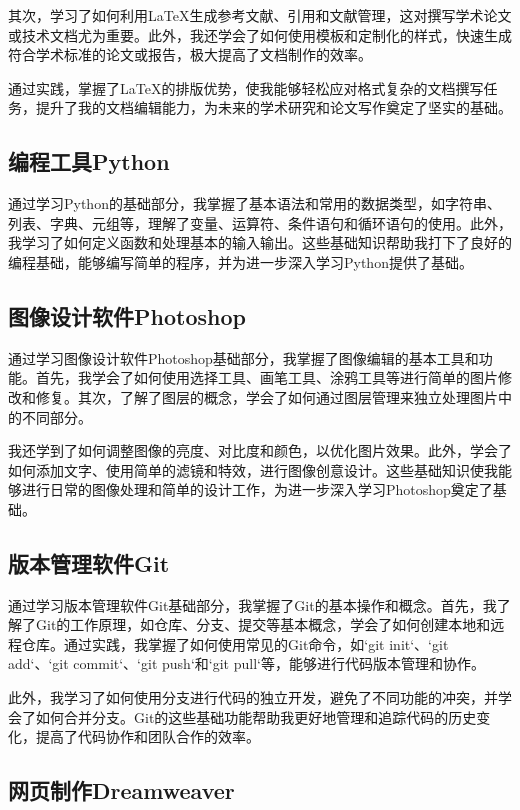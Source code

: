 \documentclass[supercite]{Experimental_Report}
\theoremstyle{definition}
\begin{document}
其次，学习了如何利用LaTeX生成参考文献、引用和文献管理，这对撰写学术论文或技术文档尤为重要。此外，我还学会了如何使用模板和定制化的样式，快速生成符合学术标准的论文或报告，极大提高了文档制作的效率。

通过实践，掌握了LaTeX的排版优势，使我能够轻松应对格式复杂的文档撰写任务，提升了我的文档编辑能力，为未来的学术研究和论文写作奠定了坚实的基础。

\subsection{编程工具Python}

通过学习Python的基础部分，我掌握了基本语法和常用的数据类型，如字符串、列表、字典、元组等，理解了变量、运算符、条件语句和循环语句的使用。此外，我学习了如何定义函数和处理基本的输入输出。这些基础知识帮助我打下了良好的编程基础，能够编写简单的程序，并为进一步深入学习Python提供了基础。

\subsection{图像设计软件Photoshop}

通过学习图像设计软件Photoshop基础部分，我掌握了图像编辑的基本工具和功能。首先，我学会了如何使用选择工具、画笔工具、涂鸦工具等进行简单的图片修改和修复。其次，了解了图层的概念，学会了如何通过图层管理来独立处理图片中的不同部分。

我还学到了如何调整图像的亮度、对比度和颜色，以优化图片效果。此外，学会了如何添加文字、使用简单的滤镜和特效，进行图像创意设计。这些基础知识使我能够进行日常的图像处理和简单的设计工作，为进一步深入学习Photoshop奠定了基础。

\subsection{版本管理软件Git}

通过学习版本管理软件Git基础部分，我掌握了Git的基本操作和概念。首先，我了解了Git的工作原理，如仓库、分支、提交等基本概念，学会了如何创建本地和远程仓库。通过实践，我掌握了如何使用常见的Git命令，如`git init`、`git add`、`git commit`、`git push`和`git pull`等，能够进行代码版本管理和协作。

此外，我学习了如何使用分支进行代码的独立开发，避免了不同功能的冲突，并学会了如何合并分支。Git的这些基础功能帮助我更好地管理和追踪代码的历史变化，提高了代码协作和团队合作的效率。

\subsection{网页制作Dreamweaver}
\end{document}
